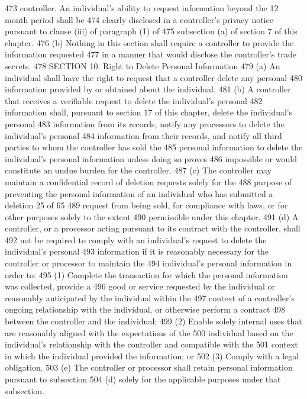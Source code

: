 473 controller. An individual’s ability to request information beyond the 12 month period shall be
474 clearly disclosed in a controller’s privacy notice pursuant to clause (iii) of paragraph (1) of
475 subsection (a) of section 7 of this chapter.
476 (b) Nothing in this section shall require a controller to provide the information requested
477 in a manner that would disclose the controller’s trade secrets.
478 SECTION 10. Right to Delete Personal Information
479 (a) An individual shall have the right to request that a controller delete any personal
480 information provided by or obtained about the individual.
481 (b) A controller that receives a verifiable request to delete the individual’s personal
482 information shall, pursuant to section 17 of this chapter, delete the individual’s personal
483 information from its records, notify any processors to delete the individual’s personal
484 information from their records, and notify all third parties to whom the controller has sold the
485 personal information to delete the individual’s personal information unless doing so proves
486 impossible or would constitute an undue burden for the controller.
487 (c) The controller may maintain a confidential record of deletion requests solely for the
488 purpose of preventing the personal information of an individual who has submitted a deletion
25 of 65
489 request from being sold, for compliance with laws, or for other purposes solely to the extent
490 permissible under this chapter.
491 (d) A controller, or a processor acting pursuant to its contract with the controller, shall
492 not be required to comply with an individual’s request to delete the individual’s personal
493 information if it is reasonably necessary for the controller or processor to maintain the
494 individual’s personal information in order to:
495 (1) Complete the transaction for which the personal information was collected, provide a
496 good or service requested by the individual or reasonably anticipated by the individual within the
497 context of a controller’s ongoing relationship with the individual, or otherwise perform a contract
498 between the controller and the individual;
499 (2) Enable solely internal uses that are reasonably aligned with the expectations of the
500 individual based on the individual’s relationship with the controller and compatible with the
501 context in which the individual provided the information; or
502 (3) Comply with a legal obligation.
503 (e) The controller or processor shall retain personal information pursuant to subsection
504 (d) solely for the applicable purposes under that subsection.
